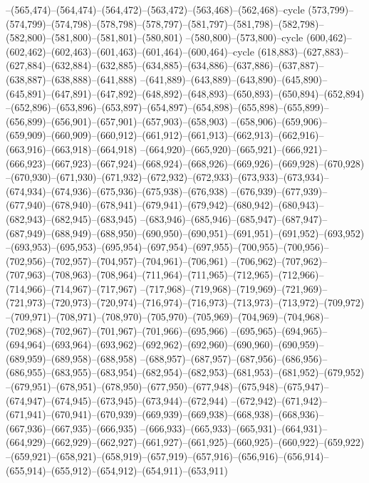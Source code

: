 --(565,474)--(564,474)--(564,472)--(563,472)--(563,468)--(562,468)--cycle
(573,799)--(574,799)--(574,798)--(578,798)--(578,797)--(581,797)--(581,798)--(582,798)--(582,800)--(581,800)--(581,801)--(580,801)
--(580,800)--(573,800)--cycle
(600,462)--(602,462)--(602,463)--(601,463)--(601,464)--(600,464)--cycle
(618,883)--(627,883)--(627,884)--(632,884)--(632,885)--(634,885)--(634,886)--(637,886)--(637,887)--(638,887)--(638,888)--(641,888)
--(641,889)--(643,889)--(643,890)--(645,890)--(645,891)--(647,891)--(647,892)--(648,892)--(648,893)--(650,893)--(650,894)--(652,894)
--(652,896)--(653,896)--(653,897)--(654,897)--(654,898)--(655,898)--(655,899)--(656,899)--(656,901)--(657,901)--(657,903)--(658,903)
--(658,906)--(659,906)--(659,909)--(660,909)--(660,912)--(661,912)--(661,913)--(662,913)--(662,916)--(663,916)--(663,918)--(664,918)
--(664,920)--(665,920)--(665,921)--(666,921)--(666,923)--(667,923)--(667,924)--(668,924)--(668,926)--(669,926)--(669,928)--(670,928)
--(670,930)--(671,930)--(671,932)--(672,932)--(672,933)--(673,933)--(673,934)--(674,934)--(674,936)--(675,936)--(675,938)--(676,938)
--(676,939)--(677,939)--(677,940)--(678,940)--(678,941)--(679,941)--(679,942)--(680,942)--(680,943)--(682,943)--(682,945)--(683,945)
--(683,946)--(685,946)--(685,947)--(687,947)--(687,949)--(688,949)--(688,950)--(690,950)--(690,951)--(691,951)--(691,952)--(693,952)
--(693,953)--(695,953)--(695,954)--(697,954)--(697,955)--(700,955)--(700,956)--(702,956)--(702,957)--(704,957)--(704,961)--(706,961)
--(706,962)--(707,962)--(707,963)--(708,963)--(708,964)--(711,964)--(711,965)--(712,965)--(712,966)--(714,966)--(714,967)--(717,967)
--(717,968)--(719,968)--(719,969)--(721,969)--(721,973)--(720,973)--(720,974)--(716,974)--(716,973)--(713,973)--(713,972)--(709,972)
--(709,971)--(708,971)--(708,970)--(705,970)--(705,969)--(704,969)--(704,968)--(702,968)--(702,967)--(701,967)--(701,966)--(695,966)
--(695,965)--(694,965)--(694,964)--(693,964)--(693,962)--(692,962)--(692,960)--(690,960)--(690,959)--(689,959)--(689,958)--(688,958)
--(688,957)--(687,957)--(687,956)--(686,956)--(686,955)--(683,955)--(683,954)--(682,954)--(682,953)--(681,953)--(681,952)--(679,952)
--(679,951)--(678,951)--(678,950)--(677,950)--(677,948)--(675,948)--(675,947)--(674,947)--(674,945)--(673,945)--(673,944)--(672,944)
--(672,942)--(671,942)--(671,941)--(670,941)--(670,939)--(669,939)--(669,938)--(668,938)--(668,936)--(667,936)--(667,935)--(666,935)
--(666,933)--(665,933)--(665,931)--(664,931)--(664,929)--(662,929)--(662,927)--(661,927)--(661,925)--(660,925)--(660,922)--(659,922)
--(659,921)--(658,921)--(658,919)--(657,919)--(657,916)--(656,916)--(656,914)--(655,914)--(655,912)--(654,912)--(654,911)--(653,911)
